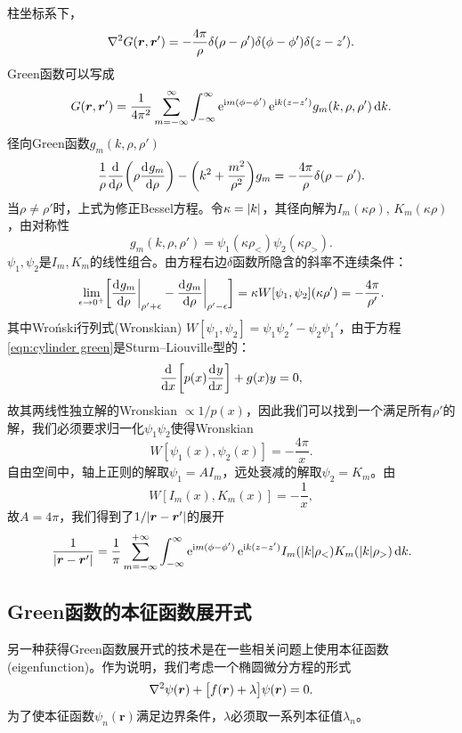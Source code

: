柱坐标系下，
\[
    \nabla^2 G(\bm r,\bm r') = -\frac{4\pi}\rho\delta(\rho - \rho')\delta(\phi - \phi')\delta(z - z').
\]
Green函数可以写成
\[
    G(\bm r,\bm r') = \frac1{4\pi^2}\sum_{m=-\infty}^\infty\int_{-\infty}^\infty\mathop{}\!\mathrm{e}^{\mathrm{i} m(\phi-\phi')}\mathop{}\!\mathrm{e}^{\mathrm{i} k(z-z')}g_m(k,\rho,\rho')\mathop{}\!\mathrm{d} k.
\]
径向Green函数$g_m(k,\rho,\rho')$
\begin{equation}
    \label{eqn:cylinder green}
    \frac1\rho\frac{\mathop{}\!\mathrm{d}^{}}{\mathrm{d}{\rho}^{}}\biggl(\rho\frac{\mathop{}\!\mathrm{d}^{}g_m}{\mathrm{d}{\rho}^{}}\biggr) - \biggl(k^2 + \frac{m^2}{\rho^2}\biggr)g_m = -\frac{4\pi}\rho\delta(\rho - \rho').
\end{equation}
当$\rho \neq \rho'$时，上式为修正Bessel方程。令$\kappa = \lvert k\rvert$，其径向解为$I_m(\kappa\rho),\,K_m(\kappa\rho)$，由对称性
\[
    g_m(k,\rho,\rho') = \psi_1(\kappa\rho_<)\psi_2(\kappa\rho_>).
\]
$\psi_1,\psi_2$是$I_m,K_m$的线性组合。由方程右边$\delta$函数所隐含的斜率不连续条件：
\[
    \lim_{\epsilon\to0^+}\biggl[{\frac{\mathop{}\!\mathrm{d}^{}g_m}{\mathrm{d}{\rho}^{}}}\biggr\rvert_{\rho'+\epsilon} - {\frac{\mathop{}\!\mathrm{d}^{}g_m}{\mathrm{d}{\rho}^{}}}\biggr\rvert_{\rho'-\epsilon}\biggr] = \kappa W[\psi_1,\psi_2](\kappa\rho') = -\frac{4\pi}{\rho'}.
\]
其中Wro\'nski行列式(Wronskian) $W[\psi_1,\psi_2] = \psi_1\psi_2' - \psi_2\psi_1'$，由于方程\eqref{eqn:cylinder green}是Sturm--Liouville型的：
\[
    \frac{\mathop{}\!\mathrm{d}^{}}{\mathrm{d}{x}^{}}\biggl[p(x)\frac{\mathop{}\!\mathrm{d}^{}y}{\mathrm{d}{x}^{}}\biggr] + g(x)y = 0,
\]
故其两线性独立解的Wronskian $\propto 1/p(x)$，因此我们可以找到一个满足所有$\rho'$的解，我们必须要求归一化$\psi_1\psi_2$使得Wronskian
\[
    W[\psi_1(x),\psi_2(x)] = -\frac{4\pi}x.
\]
自由空间中，轴上正则的解取$\psi_1 = AI_m$，远处衰减的解取$\psi_2 = K_m$。由
\begin{equation}
    \label{eq:ed-modified-bessel-wronskian}
    W[I_m(x),K_m(x)] = -\frac1x,
\end{equation}
故$A = 4\pi$，我们得到了$1/\lvert\bm r - \bm r'\rvert$的展开
\begin{equation}
    \frac1{\lvert\bm r - \bm r'\rvert} = \frac1\pi\sum_{m=-\infty}^{+\infty}\int_{-\infty}^\infty\mathop{}\!\mathrm{e}^{\mathrm{i} m(\phi-\phi')}\mathop{}\!\mathrm{e}^{\mathrm{i} k(z-z')}I_m(\lvert k\rvert\rho_<)K_m(\lvert k\rvert\rho_>)\mathop{}\!\mathrm{d} k.
\end{equation}

\subsection{Green函数的本征函数展开式}
\label{ssec:eigenfunction expansions for Green functions}

另一种获得Green函数展开式的技术是在一些相关问题上使用本征函数(eigenfunction)。作为说明，我们考虑一个椭圆微分方程的形式
\begin{equation}
    \nabla^2\psi(\bm r) + \bigl[f(\bm r) + \lambda\bigr]\psi(\bm r) = 0.
\end{equation}
为了使本征函数$\psi_n(\bm r)$满足边界条件，$\lambda$必须取一系列本征值$\lambda_n$。

